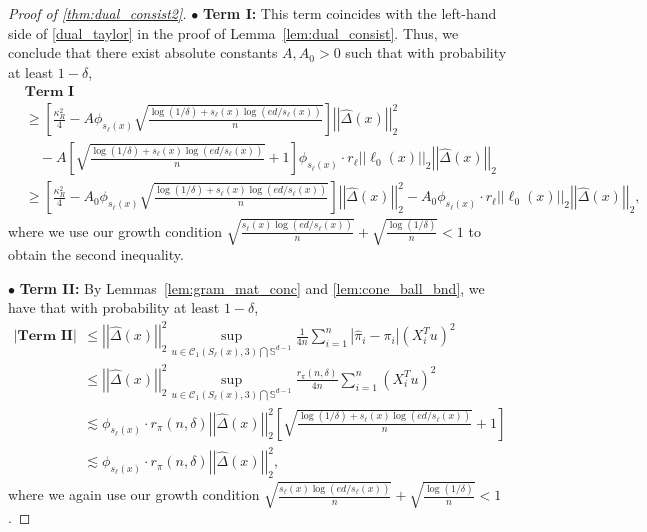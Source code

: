 \documentclass[10pt,a4paper]{amsart}
\theoremstyle{plain}
\theoremstyle{remark}
\renewcommand{\hat}{\widehat}
\newcommand{\norm}[1]{\left|\left| #1 \right|\right|}
\begin{document}
\begin{proof}[Proof of \autoref{thm:dual_consist2}]
	$\bullet$ {\bf Term I:} This term coincides with the left-hand side of \eqref{dual_taylor} in the proof of Lemma~\ref{lem:dual_consist}. Thus, we conclude that there exist absolute constants $A,A_0>0$ such that with probability at least $1-\delta$, 
	\begin{align*}
		&\textbf{Term I} \\
		&\geq \left[\frac{\kappa_R^2}{4} - A\phi_{s_{\ell}(x)} \sqrt{\frac{\log(1/\delta)+s_{\ell}(x)\log(ed/s_{\ell}(x))}{n}} \right]\norm{\hat{\Delta}(x)}_2^2 \\
		&\quad - A\left[\sqrt{\frac{\log(1/\delta)+s_{\ell}(x)\log(ed/s_{\ell}(x))}{n}} + 1\right]\phi_{s_{\ell}(x)} \cdot r_{\ell} \norm{\ell_0(x)}_2\norm{\hat{\Delta}(x)}_2\\
		&\geq \left[\frac{\kappa_R^2}{4} - A_0\phi_{s_{\ell}(x)} \sqrt{\frac{\log(1/\delta)+s_{\ell}(x)\log(ed/s_{\ell}(x))}{n}} \right]\norm{\hat{\Delta}(x)}_2^2 - A_0 \phi_{s_{\ell}(x)} \cdot r_{\ell} \norm{\ell_0(x)}_2\norm{\hat{\Delta}(x)}_2,
	\end{align*}
	where we use our growth condition $\sqrt{\frac{s_{\ell}(x)\log(ed/s_{\ell}(x))}{n}} + \sqrt{\frac{\log(1/\delta)}{n}} < 1$ to obtain the second inequality.
	
	$\bullet$ {\bf Term II:} By Lemmas~\ref{lem:gram_mat_conc} and \ref{lem:cone_ball_bnd}, we have that with probability at least $1-\delta$,
	\begin{align*}
		\left|\textbf{Term II}\right| &\leq \norm{\hat{\Delta}(x)}_2^2 \sup_{u \in \mathcal{C}_1(S_{\ell}(x),3) \bigcap \mathbb{S}^{d-1}} \frac{1}{4n} \sum_{i=1}^n \left|\hat{\pi}_i - \pi_i\right| \left(X_i^T u\right)^2\\
		&\leq \norm{\hat{\Delta}(x)}_2^2 \sup_{u \in \mathcal{C}_1(S_{\ell}(x),3) \bigcap \mathbb{S}^{d-1}} \frac{r_{\pi}(n,\delta)}{4n} \sum_{i=1}^n  \left(X_i^T u\right)^2 \\
		&\lesssim \phi_{s_{\ell}(x)} \cdot r_{\pi}(n,\delta) \norm{\hat{\Delta}(x)}_2^2 \left[\sqrt{\frac{\log(1/\delta)+s_{\ell}(x)\log(ed/s_{\ell}(x))}{n}} + 1\right]\\
		&\lesssim \phi_{s_{\ell}(x)} \cdot r_{\pi}(n,\delta) \norm{\hat{\Delta}(x)}_2^2,
	\end{align*}
	where we again use our growth condition $\sqrt{\frac{s_{\ell}(x)\log(ed/s_{\ell}(x))}{n}} + \sqrt{\frac{\log(1/\delta)}{n}} < 1$.
	

\end{proof}
\end{document}
